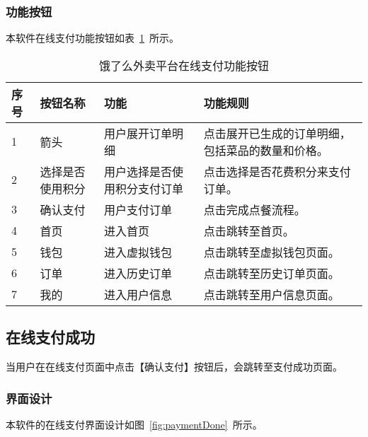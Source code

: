 \subsubsection{功能按钮}
本软件在线支付功能按钮如表~\ref{tab:table6}~所示。
\begin{table}[htbp]
    \caption{饿了么外卖平台在线支付功能按钮}\label{tab:table6}
    \vspace{0.5em}\wuhao
    \begin{tabularx}{\textwidth}{lllX}
    \toprule[1.5pt]
    序号 & 按钮名称 & 功能 & 功能规则 \\ 
    \midrule[1pt]
    1 & 箭头 & 用户展开订单明细 & 点击展开已生成的订单明细，包括菜品的数量和价格。 \\
    2 & 选择是否使用积分 & 用户选择是否使用积分支付订单 & 点击选择是否花费积分来支付订单。 \\
    3 & 确认支付 & 用户支付订单 & 点击完成点餐流程。 \\
    4 & 首页 & 进入首页 & 点击跳转至首页。 \\
    5 & 钱包 & 进入虚拟钱包 & 点击跳转至虚拟钱包页面。 \\
    6 & 订单 & 进入历史订单 & 点击跳转至历史订单页面。 \\
    7 & 我的 & 进入用户信息 & 点击跳转至用户信息页面。 \\
\bottomrule[1.5pt]
\end{tabularx}
\vspace{\baselineskip}
\end{table}

\subsection{在线支付成功}
当用户在在线支付页面中点击【确认支付】按钮后，会跳转至支付成功页面。
\subsubsection{界面设计}
本软件的在线支付界面设计如图~\ref{fig:paymentDone}~所示。
